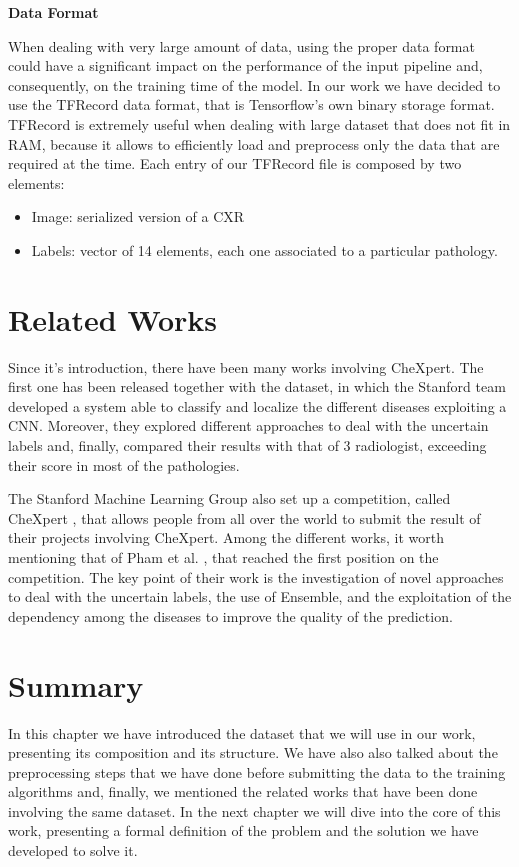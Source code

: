 \newpage
\noindent\textbf{Data Format}

\vspace{5mm}

\noindent When dealing with very large amount of data, using the proper data format could have a significant impact on the performance of the input pipeline and, consequently, on the training time of the model. In our work we have decided to use the TFRecord data format, that is Tensorflow’s own binary storage format.
TFRecord is extremely useful when dealing with large dataset that does not fit in RAM, because it allows to efficiently load and preprocess only the data that are required at the time. 
\noindent Each entry of our TFRecord file is composed by two elements: 
\begin{itemize}
    \item Image: serialized version of a \ac{CXR}
    \item Labels: vector of 14 elements, each one associated to a particular pathology.
\end{itemize}

\section{Related Works}
\label{sec:related_work}
Since it's introduction, there have been many works involving CheXpert. The first one has been released together with the dataset, in which the Stanford team developed a system able to classify and localize the different diseases exploiting a \ac{CNN}. Moreover, they explored different approaches to deal with the uncertain labels and, finally, compared their results with that of 3 radiologist, exceeding their score in most of the pathologies. 

\noindent The Stanford Machine Learning Group also set up a competition, called CheXpert \cite{chexpert_competition}, that allows people from all over the world to submit the result of their projects involving CheXpert. Among the different works, it worth mentioning that of Pham et al. \cite{pham2019interpreting}, that reached the first position on the competition. The key point of their work is the investigation of novel approaches to deal with the uncertain labels, the use of Ensemble, and the exploitation of the dependency among the diseases to improve the quality of the prediction.

\section{Summary}
\label{sec:summary_chapter_three}
In this chapter we have introduced the dataset that we will use in our work, presenting its composition and its structure. We have also also talked about the preprocessing steps that we have done before submitting the data to the training algorithms and, finally, we mentioned the related works that have been done involving the same dataset. In the next chapter we will dive into the core of this work, presenting a formal definition of the problem and the solution we have developed to solve it. 